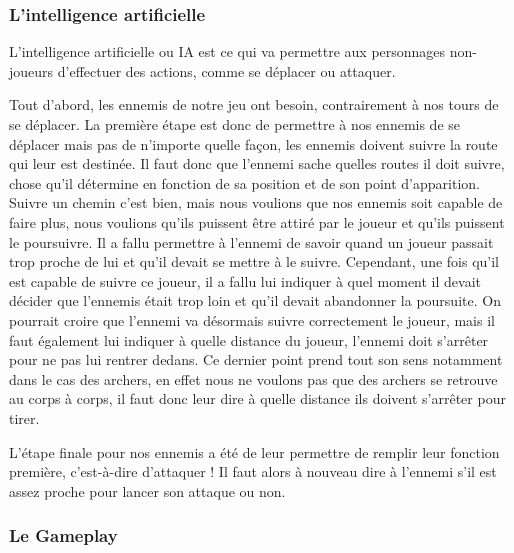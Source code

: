 \documentclass[a4paper, 12pt]{article}
\begin{document}
		\subsubsection{L'intelligence artificielle}
		L’intelligence artificielle ou IA est ce qui va permettre aux personnages non-joueurs d’effectuer des actions, comme se déplacer ou attaquer. 
\par Tout d’abord, les ennemis de notre jeu ont besoin, contrairement à nos tours de se déplacer. La première étape est donc de permettre à nos ennemis de se déplacer mais pas de n’importe quelle façon, les ennemis doivent suivre la route qui leur est destinée. Il faut donc que l’ennemi sache quelles routes il doit suivre, chose qu’il détermine en fonction de sa position et de son point d'apparition. Suivre un chemin c’est bien, mais nous voulions que nos ennemis soit capable de faire plus, nous voulions qu’ils puissent être attiré par le joueur et qu’ils puissent le poursuivre. Il a fallu permettre à l’ennemi de savoir quand un joueur passait trop proche de lui et qu’il devait se mettre à le suivre. Cependant, une fois qu’il est capable de suivre ce joueur, il a fallu lui indiquer à quel moment il devait décider que l’ennemis était trop loin et qu’il devait abandonner la poursuite. On pourrait croire que l’ennemi va désormais suivre correctement le joueur, mais il faut également lui indiquer à quelle distance du joueur, l’ennemi doit s’arrêter pour ne pas lui rentrer dedans. Ce dernier point prend tout son sens notamment dans le cas des archers, en effet nous ne voulons pas que des archers se retrouve au corps à corps, il faut donc leur dire à quelle distance ils doivent s’arrêter pour tirer.
\par L’étape finale pour nos ennemis a été de leur permettre de remplir leur fonction première, c’est-à-dire d’attaquer ! Il faut alors à nouveau dire à l’ennemi s’il est assez proche pour lancer son attaque ou non.

		\subsubsection{Le Gameplay}
\end{document}
